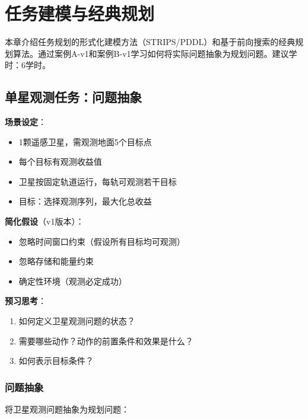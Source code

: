 \chapter{任务建模与经典规划}

\begin{levelbox}
本章介绍任务规划的形式化建模方法（STRIPS/PDDL）和基于前向搜索的经典规划算法。通过案例A-v1和案例B-v1学习如何将实际问题抽象为规划问题。建议学时：6学时。
\end{levelbox}

\section{单星观测任务：问题抽象}

\begin{caseboxA}
\textbf{场景设定}：
\begin{itemize}
  \item 1颗遥感卫星，需观测地面5个目标点
  \item 每个目标有观测收益值
  \item 卫星按固定轨道运行，每轨可观测若干目标
  \item 目标：选择观测序列，最大化总收益
\end{itemize}

\textbf{简化假设}（v1版本）：
\begin{itemize}
  \item 忽略时间窗口约束（假设所有目标均可观测）
  \item 忽略存储和能量约束
  \item 确定性环境（观测必定成功）
\end{itemize}

\textbf{预习思考}：
\begin{enumerate}
  \item 如何定义卫星观测问题的状态？
  \item 需要哪些动作？动作的前置条件和效果是什么？
  \item 如何表示目标条件？
\end{enumerate}
\end{caseboxA}

\subsection{问题抽象}

将卫星观测问题抽象为规划问题：

